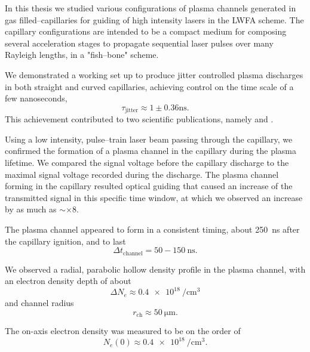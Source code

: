 \documentclass[../main.tex]{subfiles}
\begin{document}
In this thesis we studied various configurations of plasma channels generated in gas filled--capillaries for guiding of high intensity lasers in the LWFA scheme. The capillary configurations are intended to be a compact medium for composing several acceleration stages to propagate sequential laser pulses over many Rayleigh lengths, in a "fish--bone" scheme.

We demonstrated a working set up to produce jitter controlled plasma discharges in both straight and curved capillaries, achieving control on the time scale of a few nanoseconds,
\begin{equation*}
    	\tau_\text{jitter}\approx 1\pm 0.36\si{\ns}.
\end{equation*}
This achievement contributed to two scientific publications, namely  \cite{andBeharEhudLowCapillary} and \cite{andBeharEhudGasPulse}.

Using a low intensity, pulse--train laser beam passing through the capillary, we confirmed the formation of a plasma channel in the capillary during the plasma lifetime. We compared the signal voltage before the capillary discharge to the maximal signal voltage recorded during the discharge. The plasma channel forming in the capillary resulted optical guiding that caused an increase of the transmitted signal in this specific time window, at which we observed an increase by as much as $\sim \times 8$.

The plasma channel appeared to form in a consistent timing, about \SI{250}{\ns} after the capillary ignition, and to last 
\begin{equation*}
    \Delta t_\text{channel}=50-150\ \si{\ns}.
\end{equation*}

We observed a radial, parabolic hollow density profile in the plasma channel, with an electron density depth of about 
$$\Delta N_e \approx\SI{0.4e18}{\per\cubic\cm}$$
and channel radius
$$r_\text{ch}\approx \SI{50}{\um}.$$

The on-axis electron density was measured to be on the order of $$N_e(0)\approx \SI{0.4e18}{\per\cubic\cm}.$$

\end{document}
